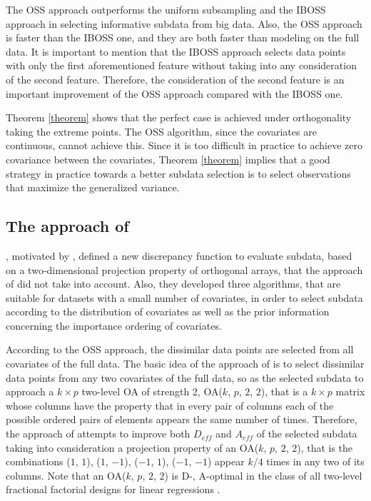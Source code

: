 \documentclass[12pt]{article}
\theoremstyle{definition}
\begin{document}
	The OSS approach outperforms the uniform subsampling and the IBOSS approach in selecting informative subdata from big data. Also, the OSS approach is faster than the IBOSS one, and they are both faster than modeling on the full data. It is important to mention that the IBOSS approach selects data points with only the first aforementioned feature without taking into any consideration of the second feature. Therefore, the consideration of the second feature is an important improvement of the OSS approach compared with the IBOSS one.
	
	Theorem \ref{theorem} shows that the perfect case is achieved under orthogonality taking the extreme points. The OSS algorithm, since the covariates are
	continuous, cannot achieve this.  Since it is too difficult in practice to achieve zero covariance between the covariates, Theorem \ref{theorem}  implies that a good strategy in practice towards a better subdata selection is to select observations that maximize the generalized variance.
	
	
	\subsection{The approach of \cite{ren&zhao}}
	\cite{ren&zhao}, motivated by \cite{wang2021oss}, defined
	a new discrepancy function to evaluate subdata, based on a two-dimensional projection property of orthogonal arrays, that the approach of \cite{wang2021oss} did not take into account. Also, they developed three algorithms, that are suitable for datasets with a small number of covariates, in order to select subdata according to the distribution of covariates as well as the prior information concerning the importance ordering of covariates.
	
	According to the OSS approach, the dissimilar data points are selected
	from all covariates of the full data. The basic idea of the approach of \cite{ren&zhao} is to select dissimilar data points from any two covariates of the full data, so as the selected subdata to approach a $k\times p$ two-level OA of strength 2, OA($k$, $p$, $2$, $2$), that is a $k\times p$ matrix whose columns have the property that in every pair of columns each of the possible ordered pairs of elements appears the same number of times. Therefore, the approach of \cite{ren&zhao} attempts to improve both $D_{eff}$ and $A_{eff}$ of the selected subdata taking into consideration a projection property of an OA($k$, $p$, $2$, $2$), that is the combinations ($1$, $1$), ($1$, $-1$), ($-1$, $1$), ($-1$, $-1$) appear $k/4$ times in any two of its columns. Note that an OA($k$, $p$, $2$, $2$) is D-, A-optimal in the class of all two-level fractional factorial designs for linear regressions \citep{dey&mukerjee}.
	
\end{document}
